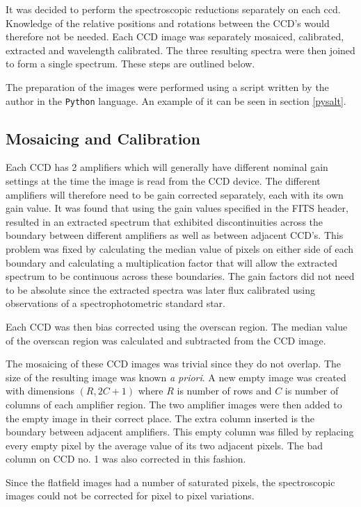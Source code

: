 It was decided to perform the spectroscopic reductions separately on each ccd. Knowledge of the relative positions and rotations between the CCD's would therefore not be needed. Each CCD image was separately mosaiced, calibrated, extracted and wavelength calibrated. The three resulting spectra were then joined to form a single spectrum. These steps are outlined below.

The preparation of the images were performed using a script written by the author in the \texttt{Python} language. An example of it can be seen in section \ref{pysalt}. 

\subsection{Mosaicing and Calibration}
\label{calibrate}

Each CCD has 2 amplifiers which will generally have different nominal gain settings at the time the image is read from the CCD device. The different amplifiers will therefore need to be gain corrected separately, each with its own gain value. It was found that using the gain values specified in the FITS header, resulted in an extracted spectrum that exhibited discontinuities across the boundary between different amplifiers as well as between adjacent CCD's. This problem was fixed by calculating the median value of pixels on either side of each boundary and calculating a multiplication factor that will allow the extracted spectrum to be continuous across these boundaries. The gain factors did not need to be absolute since the extracted spectra was later flux calibrated using observations of a spectrophotometric standard star.

Each CCD was then bias corrected using the overscan region. The median value of the overscan region was calculated and subtracted from the CCD image.

The mosaicing of these CCD images was trivial since they do not overlap. The size of the resulting image was known \textit{a priori}. A new empty image was created with dimensions $(R,2C+1)$ where $R$ is number of rows and $C$ is number of columns of each amplifier region. The two amplifier images were then added to the empty image in their correct place. The extra column inserted is the boundary between adjacent amplifiers. This empty column was filled by replacing every empty pixel by the average value of its two adjacent pixels. The bad column on CCD no. 1 was also corrected in this fashion.

Since the flatfield images had a number of saturated pixels, the spectroscopic images could not be corrected for pixel to pixel variations.

